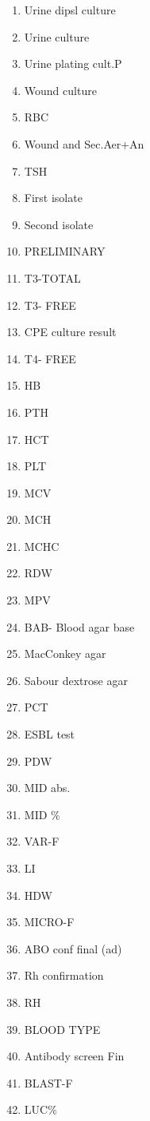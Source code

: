 \documentclass[a4paper,12pt]{article}
\begin{document}
\begin{appendices}
\begin{enumerate}
   			\item Urine dipsl culture
   			\item Urine culture
   			\item Urine plating cult.P
   			\item Wound culture
   			\item RBC
   			\item Wound and Sec.Aer+An
   			\item TSH
   			\item First isolate
   			\item Second isolate
   			\item PRELIMINARY
   			\item T3-TOTAL
   			\item T3- FREE
   			\item CPE culture result
   			\item T4- FREE
   			\item HB
   			\item PTH
   			\item HCT
   			\item PLT
   			\item MCV
   			\item MCH
   			\item MCHC
   			\item RDW
   			\item MPV
   			\item BAB- Blood agar base
   			\item MacConkey agar
   			\item Sabour dextrose agar
   			\item PCT
   			\item ESBL test
   			\item PDW
   			\item MID abs.
   			\item MID \%
   			\item VAR-F
   			\item LI
   			\item HDW
   			\item MICRO-F
   			\item ABO conf final (ad)
   			\item Rh confirmation
   			\item RH
   			\item BLOOD TYPE
   			\item Antibody screen Fin
   			\item BLAST-F
   			\item LUC\%

\end{enumerate}
\end{appendices}
\end{document}
